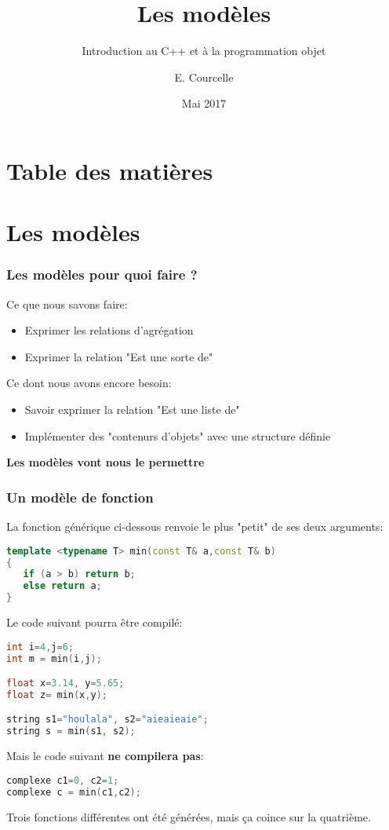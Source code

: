 \documentclass{beamer}
\title{Les modèles}
\subtitle{Introduction au C++ et à la programmation objet}
\author{E. Courcelle}\institute{CALMIP, UMS 3669}
\date{Mai 2017}
\begin{document}
\begin{frame}
\titlepage
\end{frame}

\section*{Table des matières}
\begin{frame}
\tableofcontents
\end{frame}


\section{Les modèles}

\begin{frame}[fragile=singleslide,shrink=20]
\frametitle {Les modèles pour quoi faire ?}

Ce que nous savons faire:
\begin{itemize}
\item{Exprimer les relations d'agrégation}
\item{Exprimer la relation "Est une sorte de"}
\end{itemize}

Ce dont nous avons encore besoin:
\begin{itemize}
\item{Savoir exprimer la relation "Est une liste de"}
\item{Implémenter des "contenurs d'objets" avec une structure définie}
\end{itemize}

\textbf{Les modèles vont nous le permettre}
\end{frame}

\begin{frame}[fragile=singleslide,shrink=20]
\frametitle {Un modèle de fonction}

La fonction générique ci-dessous renvoie le plus "petit" de ses deux arguments:
\begin{lstlisting}[language=c++]
template <typename T> min(const T& a,const T& b)
{
   if (a > b) return b;
   else return a;
}
\end{lstlisting}

Le code suivant pourra être compilé:
\begin{lstlisting}[language=c++]
int i=4,j=6;
int m = min(i,j);

float x=3.14, y=5.65;
float z= min(x,y);

string s1="houlala", s2="aieaieaie";
string s = min(s1, s2);
\end{lstlisting}

Mais le code suivant \textbf{ne compilera pas}:
\begin{lstlisting}[language=c++]
complexe c1=0, c2=1;
complexe c = min(c1,c2);
\end{lstlisting}

Trois fonctions différentes ont été générées, mais ça coince sur la quatrième.
\end{frame}
\end{document}
